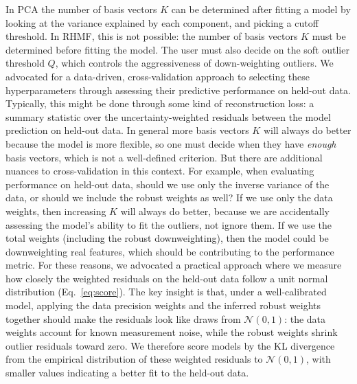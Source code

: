 \documentclass[onecolumn,floatfix,linenumbers,trackchanges]{aastex631}
\begin{document}
In PCA the number of basis vectors $K$ can be determined after fitting a model by looking at the variance explained by each component, and picking a cutoff threshold. In RHMF, this is not possible: the number of basis vectors $K$ must be determined before fitting the model. The user must also decide on the soft outlier threshold $Q$, which controls the aggressiveness of down-weighting outliers.
We advocated for a data-driven, cross-validation approach to selecting these hyperparameters through assessing their predictive performance on held-out data.
Typically, this might be done through some kind of reconstruction loss: a summary statistic over the uncertainty-weighted residuals between the model prediction on held-out data. 
In general more basis vectors $K$ will always do better because the model is more flexible, so one must decide when they have \emph{enough} basis vectors, which is not a well-defined criterion.
But there are additional nuances to cross-validation in this context. 
For example, when evaluating performance on held-out data, should we use only the inverse variance of the data, or should we include the robust weights as well? If we use only the data weights, then increasing $K$ will always do better, because we are accidentally assessing the model's ability to fit the outliers, not ignore them. If we use the total weights (including the robust downweighting), then the model could be downweighting real features, which should be contributing to the performance metric.
For these reasons, we advocated a practical approach where we measure how closely the weighted residuals on the held-out data follow a unit normal distribution (Eq.~\eqref{eq:score}). The key insight is that, under a well-calibrated model, applying the data precision weights and the inferred robust weights together should make the residuals look like draws from $\mathcal{N}(0,1)$: the data weights account for known measurement noise, while the robust weights shrink outlier residuals toward zero. We therefore score models by the KL divergence from the empirical distribution of these weighted residuals to $\mathcal{N}(0,1)$, with smaller values indicating a better fit to the held-out data.
\end{document}
